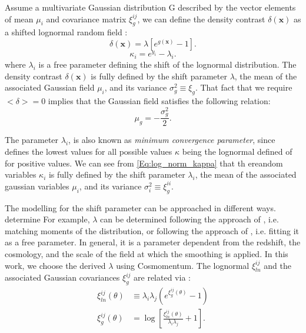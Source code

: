 \documentclass{aa}
\begin{document}
Assume a multivariate Gaussian distribution G described by the vector elements of mean $\mu_i$ and covariance matrix $\xi_g^{ij}$, we can define the density contrast $\delta(\bm{x})$ as a shifted lognormal random field :
\begin{equation}
    \delta(\bm{x})=\lambda[e^{g(\bm{x})}-1]. 
\end{equation}\label{Eq:log_norm_kappa}
\begin{equation}\label{Eq:log_norm_kappa}
    \kappa_{i}=e^{y_i}-\lambda_i. 
\end{equation}
where $\lambda_i$ is a free parameter defining the shift of the lognormal distribution.  The density contrast $\delta(\bm{x})$ is fully defined by the shift parameter $\lambda$, the mean of the associated Gaussian field $\mu_i$, and its variance $\sigma_g^2\equiv \xi_g$. That fact that we require $<\delta>=0$ implies that the Gaussian field satisfies the following relation:
\begin{equation}
    \mu_g=-\frac{\sigma_g^2}{2}.
\end{equation}



The parameter $\lambda_i$, is also known as \textit{minimum convergence
parameter}, since defines the lowest values for all possible values $\kappa$ being the lognormal defined of for positive values. We can see from \autoref{Eq:log_norm_kappa} that th ereandom variables $\kappa_i$ is fully defined by the shift parameter $\lambda_i$, the mean of the associated gaussian variables $\mu_i$, and its variance $\sigma_i^2\equiv \xi_g^{ii}$. 

 The modelling for the shift parameter can be approached in different ways.  determine
For example, $\lambda$ can be determined following the approach of \citet{xavier2016improving} , i.e.  matching moments of the distribution, or following the approach of \citet{hilbert2011cosmic}, i.e. fitting it as a free parameter. In general, it is a parameter dependent from the redshift, the cosmology, and the scale of the field at which the smoothing is applied.
In this work, we choose the derived $\lambda$ using Cosmomentum.
The lognormal $\xi^{ij}_{ln}$ and the associated Gaussian covariances $ \xi^{ij}_g$ are related via :
\begin{align}
    \xi^{ij}_{ln}(\theta) & \equiv \lambda_i \lambda_j (e^{ \xi^{ij}_g(\theta)}-1) \nonumber \\ 
    \xi^{ij}_g(\theta)&=\log{\left[ \frac{\xi^{ij}_{ln}(\theta)}{\lambda_i \lambda_j}+1\right ]}. \label{Eq:log_norm_corr}
\end{align}
\end{document}
